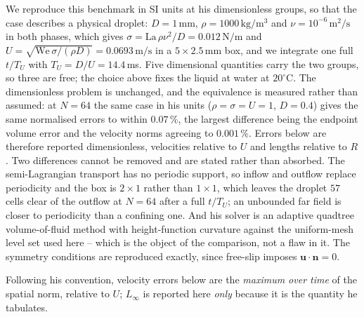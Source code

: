 \documentclass[preprint,3p,11pt]{elsarticle}
\newcommand{\uvec}{\mathbf{u}}
\begin{document}
We reproduce this benchmark in SI units at his dimensionless groups, so that the case
describes a physical droplet: $D=1\,\mathrm{mm}$, $\rho=1000\,\mathrm{kg/m^{3}}$ and
$\nu=10^{-6}\,\mathrm{m^{2}/s}$ in both phases, which gives
$\sigma=\mathrm{La}\,\rho\nu^{2}/D=0.012\,\mathrm{N/m}$ and
$U=\sqrt{\mathrm{We}\,\sigma/(\rho D)}=0.0693\,\mathrm{m/s}$ in a
$5\times2.5\,\mathrm{mm}$ box, and we integrate one full $t/T_U$ with $T_U=D/U=14.4\,$ms.
Five dimensional quantities carry the two groups, so three are free; the choice above fixes
the liquid at water at $20^{\circ}$C. The dimensionless problem is unchanged, and the
equivalence is measured rather than assumed: at $N=64$ the same case in his units
($\rho=\sigma=U=1$, $D=0.4$) gives the same normalised errors to within $0.07\,\%$, the
largest difference being the endpoint volume error and the velocity norms agreeing to
$0.001\,\%$. Errors below are therefore reported dimensionless, velocities relative to $U$
and lengths relative to $R$. Two differences cannot be removed and are stated rather
than absorbed. The semi-Lagrangian transport has no periodic support, so inflow and outflow
replace periodicity and the box is $2\times1$ rather than $1\times1$, which leaves the
droplet $57$ cells clear of the outflow at $N=64$ after a full $t/T_U$; an unbounded far
field is closer to periodicity than a confining one. And his solver is an adaptive quadtree
volume-of-fluid method with height-function curvature against the uniform-mesh level set
used here -- which is the object of the comparison, not a flaw in it. The symmetry
conditions are reproduced exactly, since free-slip imposes $\uvec\cdot\mathbf{n}=0$.

Following his convention, velocity errors below are the \emph{maximum over time} of the
spatial norm, relative to $U$; $L_\infty$ is reported here \emph{only} because it is the
quantity he tabulates.
\end{document}
